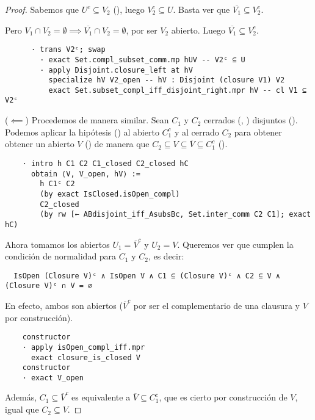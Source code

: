 \begin{proof}
  Sabemos que $U^c \subseteq V_2$ (), luego $V_2^c \subseteq U$. Basta ver que $\overline{V_1} \subseteq V_2^c$.

  Pero $V_1 \cap V_2 = \emptyset \implies \overline{V_1} \cap V_2 = \emptyset$, por ser $V_2$ abierto. Luego $\overline{V_1} \subseteq V_2^c$.

  \begin{lstlisting}
      · trans V2ᶜ; swap
        · exact Set.compl_subset_comm.mp hUV -- V2ᶜ ⊆ U
        · apply Disjoint.closure_left at hV
          specialize hV V2_open -- hV : Disjoint (closure V1) V2
          exact Set.subset_compl_iff_disjoint_right.mpr hV -- cl V1 ⊆ V2ᶜ \end{lstlisting}

  ($\impliedby$) Procedemos de manera similar. Sean $C_1$ y $C_2$ cerrados (, ) disjuntos (). Podemos aplicar la hipótesis () al abierto $C_1^c$ y al cerrado $C_2$ para obtener obtener un abierto $V$ () de manera que $C_2 \subseteq V \subseteq \overline{V} \subseteq C_1^c$ ().

\begin{lstlisting}
    · intro h C1 C2 C1_closed C2_closed hC
      obtain ⟨V, V_open, hV⟩ :=
        h C1ᶜ C2
        (by exact IsClosed.isOpen_compl)
        C2_closed
        (by rw [← ABdisjoint_iff_AsubsBc, Set.inter_comm C2 C1]; exact hC)
\end{lstlisting}

  Ahora tomamos los abiertos $U_1 = \overline{V}^c$ y $U_2 = V$. Queremos ver que cumplen la condición de normalidad para $C_1$ y $C_2$, es decir:
  
\begin{lstlisting}
  IsOpen (Closure V)ᶜ ∧ IsOpen V ∧ C1 ⊆ (Closure V)ᶜ ∧ C2 ⊆ V ∧ (Closure V)ᶜ ∩ V = ∅
\end{lstlisting}
  
  En efecto, ambos son abiertos ($\overline{V}^c$ por ser el complementario de una clausura y $V$ por construcción).

\begin{lstlisting}
    constructor
    · apply isOpen_compl_iff.mpr
      exact closure_is_closed V
    constructor
    · exact V_open
\end{lstlisting}

  Además, $C_1 \subseteq \overline{V}^c$ es equivalente a $\overline{V} \subseteq C_1^c$, que es cierto por construcción de $V$, igual que $C_2 \subseteq V$.
  

\end{proof}
